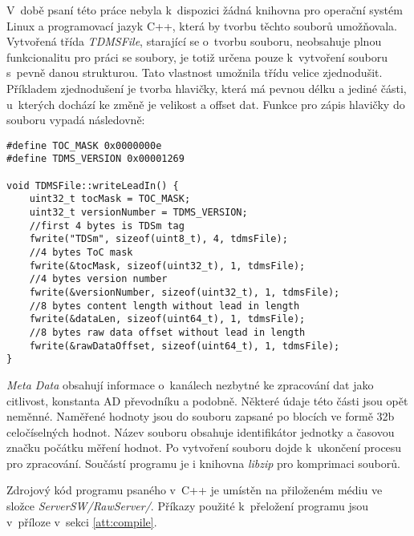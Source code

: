 V~době psaní této práce nebyla k~dispozici žádná knihovna pro operační systém Linux a programovací jazyk C++, která by tvorbu těchto souborů umožňovala. Vytvořená třída \textit{TDMSFile}, starající se o~tvorbu souboru, neobsahuje plnou funkcionalitu pro práci se soubory, je totiž určena pouze k~vytvoření souboru s~pevně danou strukturou. Tato vlastnost umožnila třídu velice zjednodušit. Příkladem zjednodušení je tvorba hlavičky, která má pevnou délku a jediné části, u~kterých dochází ke změně je velikost a offset dat. Funkce pro zápis hlavičky do souboru vypadá následovně:
\begin{lstlisting}[style=c++, caption={Funkce pro zápis hlavičky tdms souboru.}]
#define TOC_MASK 0x0000000e
#define TDMS_VERSION 0x00001269

void TDMSFile::writeLeadIn() {
    uint32_t tocMask = TOC_MASK;
    uint32_t versionNumber = TDMS_VERSION;
    //first 4 bytes is TDSm tag
    fwrite("TDSm", sizeof(uint8_t), 4, tdmsFile);
    //4 bytes ToC mask
    fwrite(&tocMask, sizeof(uint32_t), 1, tdmsFile);
    //4 bytes version number
    fwrite(&versionNumber, sizeof(uint32_t), 1, tdmsFile);
    //8 bytes content length without lead in length
    fwrite(&dataLen, sizeof(uint64_t), 1, tdmsFile);
    //8 bytes raw data offset without lead in length
    fwrite(&rawDataOffset, sizeof(uint64_t), 1, tdmsFile);
}
\end{lstlisting}

\textit{Meta Data} obsahují informace o~kanálech nezbytné ke zpracování dat jako citlivost, konstanta AD převodníku a podobně. Některé údaje této části jsou opět neměnné. Naměřené hodnoty jsou do souboru zapsané po blocích ve formě 32b celočíselných hodnot. Název souboru obsahuje identifikátor jednotky a časovou značku počátku měření hodnot. Po vytvoření souboru dojde k~ukončení procesu pro zpracování. Součástí programu je i knihovna \textit{libzip} pro komprimaci souborů.

Zdrojový kód programu psaného v~C++ je umístěn na přiloženém médiu ve složce \textit{ServerSW/RawServer/}. Příkazy použité k~přeložení programu jsou v~příloze v~sekci \ref{att:compile}.
 
